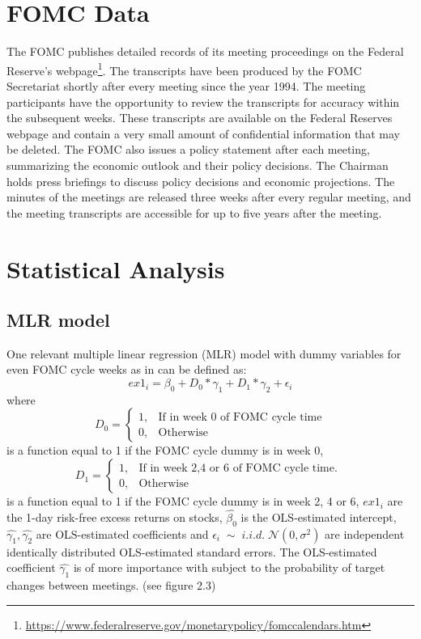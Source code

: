 \section{FOMC Data}

The FOMC publishes detailed records of its meeting proceedings on the Federal Reserve's webpage\footnote{\url{https://www.federalreserve.gov/monetarypolicy/fomccalendars.htm}}.  
The transcripts have been produced by the FOMC Secretariat shortly after every meeting since the year 1994.
The meeting participants have the opportunity to review the transcripts for accuracy within the subsequent weeks. 
These transcripts are available on the Federal Reserves webpage and contain a very small amount of confidential information that may be deleted. 
The FOMC also issues a policy statement after each meeting,  summarizing the economic outlook and their policy decisions. 
The Chairman holds press briefings to discuss policy decisions and economic projections. 
The minutes of the meetings are released three weeks after every regular meeting, and the meeting transcripts are accessible for up to five years after the meeting.

\section{Statistical Analysis}

\subsection{MLR model}

One relevant multiple linear regression (MLR) model with dummy variables for even FOMC cycle weeks as in \parencite{cieslak_stock_2019} can be defined as:
\begin{equation}
	ex1_{i}=\beta_{0}+D_0*\gamma_{1}+D_1*\gamma_{2}+\epsilon_i
\end{equation}
where
\begin{equation}
    D_0=
    \begin{cases}
      1, & \text{If in week 0 of FOMC cycle time}\\
      0, & \text{Otherwise}
    \end{cases}
\end{equation}
is a function equal to 1 if the FOMC cycle dummy is in week 0,
\begin{equation}
    D_1=
    \begin{cases}
      1, & \text{If in week 2,4 or 6 of FOMC cycle time. } \\
      0, & \text{Otherwise}
    \end{cases}
\end{equation}
is a function equal to 1 if the FOMC cycle dummy is in week 2,  4 or 6,
$ {ex1_{i}} $ are the 1-day risk-free excess returns on stocks,
$ { \hat{\beta_{0}} } $ is the OLS-estimated intercept,
$ { \hat{\gamma_{1}}, \hat{\gamma_{2}} } $  are OLS-estimated coefficients and
$ { \epsilon_i \; \sim \; i.i.d.  \; \mathcal{N}\left(0, \sigma^2 \right) } $
are independent identically distributed OLS-estimated standard errors. 
The OLS-estimated coefficient $ {\hat{\gamma_{1}}} $ is of more importance with subject to the probability of target changes between meetings. (see figure 2.3)

